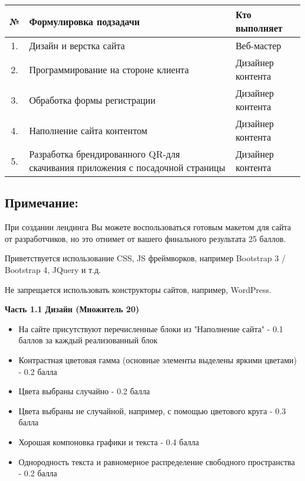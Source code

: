 \begin{table}[H]
    \begin{center}
        \begin{tabular}{|c|p{8cm}|l|}
            \hline
            № & Формулировка подзадачи& Кто выполняет \\
            \hline
            1.& Дизайн и верстка сайта& Веб-мастер\\
            \hline
            2.& Программирование на стороне клиента& Дизайнер контента\\
            \hline
            3.& Обработка формы регистрации& Дизайнер контента\\
            \hline
            4.& Наполнение сайта контентом& Дизайнер контента\\
            \hline
            5.& Разработка брендированного QR-для скачивания приложения с посадочной страницы& Дизайнер контента \\
            \hline           
        \end{tabular}
    \end{center}
\end{table}

\subsection*{Примечание:}

При создании лендинга Вы можете воспользоваться готовым макетом для сайта от разработчиков, но это отнимет от вашего финального результата 25 баллов.

Приветствуется использование CSS, JS фреймворков, например Bootstrap 3 / Bootstrap 4, JQuery и т.д.

Не запрещается использовать конструкторы сайтов, например, WordPress.

\markSection

\textbf{Часть 1.1 Дизайн (Множитель 20)}
\begin{itemize}
    \item На сайте присутствуют перечисленные блоки из "Наполнение сайта" - 0.1 баллов за каждый реализованный блок
    \item Контрастная цветовая гамма (основные элементы выделены яркими цветами) - 0.2 балла
    \item Цвета выбраны случайно - 0.2 балла
    \item Цвета выбраны не случайной, например, с помощью цветового круга - 0.3 балла
    \item Хорошая компоновка графики и текста - 0.4 балла
    \item Однородность текста и равномерное распределение свободного пространства - 0.2 балла
\end{itemize}


